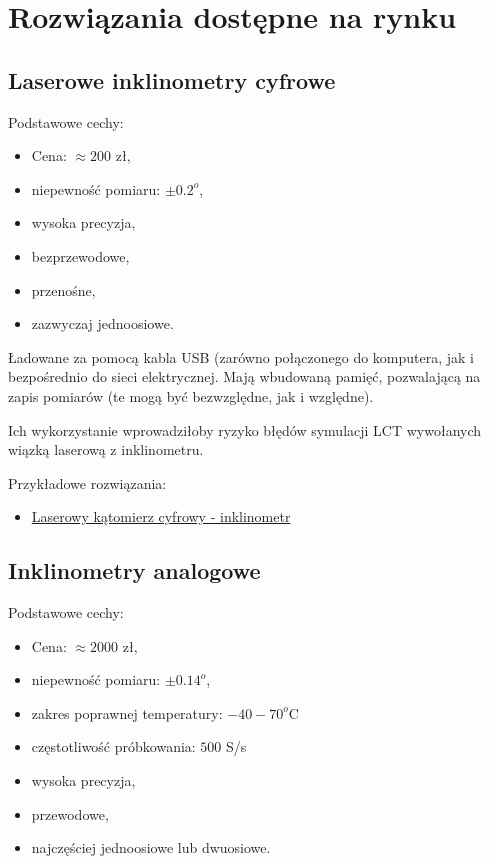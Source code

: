 \chapter{Rozwiązania dostępne na rynku}

\section{Laserowe inklinometry cyfrowe}

Podstawowe cechy:
\begin{itemize}
    \item Cena: $\approx 200$ zł,
    \item niepewność pomiaru: $\pm 0.2^{o}$,
    \item wysoka precyzja,
    \item bezprzewodowe,
    \item przenośne,
    \item zazwyczaj jednoosiowe.
\end{itemize}

Ładowane za pomocą kabla USB (zarówno połączonego do komputera, jak i bezpośrednio do sieci elektrycznej. Mają wbudowaną pamięć, pozwalającą na zapis pomiarów (te mogą być bezwzględne, jak i względne).

Ich wykorzystanie wprowadziłoby ryzyko błędów symulacji LCT wywołanych wiązką laserową z inklinometru.

Przykładowe rozwiązania:
\begin{itemize}
    \item \href{https://www.miniinthebox.com/pl/p/laserowy-katomierz-cyfrowy-inklinometr-linijka-poziomu-lasera-usb-platny-inklinometr-podstawa-magnetyczna-goniometr-magnes-narzedzia-do-pochylania_p8960976.html?currency=PLN&litb_from=paid_adwords_shopping&sku=1_45&country_code=pl&utm_source=google_shopping&utm_medium=cpc&utm_campaign=17688774668&adword_mt=&adword_ct=&adword_kw=&adword_pos=&adword_pl=&adword_net=x&adword_tar=&adw_src_id=3619800739_17688774668__&gclid=Cj0KCQiA5NSdBhDfARIsALzs2EBPmJYEhlH3uvAXeq00x4VJm2TBsisSafEBhxoMUEuFMnTBFwyQr5gaAqf6EALw_wcB}{Laserowy kątomierz cyfrowy - inklinometr}
\end{itemize}

\section{Inklinometry analogowe}

Podstawowe cechy:
\begin{itemize}
    \item Cena: $\approx 2000$ zł,
    \item niepewność pomiaru: $\pm 0.14^{o}$,
    \item zakres poprawnej temperatury: $-40-70^{o}$C
    \item częstotliwość próbkowania: $500$ S/s
    \item wysoka precyzja,
    \item przewodowe,
    \item najczęściej jednoosiowe lub dwuosiowe.
\end{itemize}

